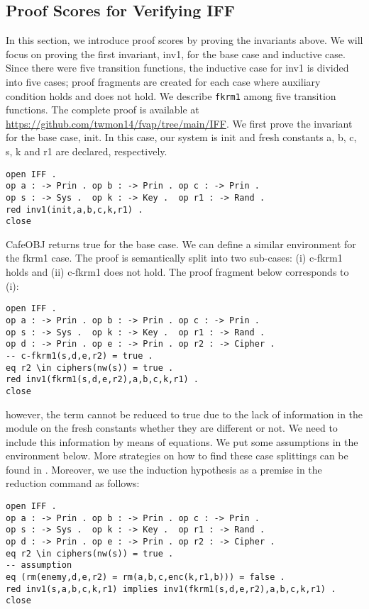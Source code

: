 \documentclass[a4paper,fleqn]{cas-dc}
\begin{document}
\subsection{Proof Scores for Verifying IFF} \label{pscores}
In this section, we introduce proof scores by proving the invariants above. We will focus on proving the first invariant, inv1, for the base case and inductive case. Since there were five transition functions, the inductive case for inv1 is divided into five cases; proof fragments are created for each case where auxiliary condition holds and does not hold. We describe \verb!fkrm1! among five transition functions. The complete proof is available at \url{https://github.com/twmon14/fvap/tree/main/IFF}. We first prove the invariant for the base case, init. In this case, our system is init and fresh constants a, b, c, s, k and r1 are declared, respectively.
\begin{small}
\begin{verbatim}
open IFF .
op a : -> Prin . op b : -> Prin . op c : -> Prin .
op s : -> Sys .  op k : -> Key .  op r1 : -> Rand .
red inv1(init,a,b,c,k,r1) .
close
\end{verbatim}
\end{small}
CafeOBJ returns true for the base case. We can define a similar environment for the fkrm1 case. The proof is semantically split into two sub-cases: (i) c-fkrm1 holds and (ii) c-fkrm1 does not hold. The proof fragment below corresponds to (i):
\begin{small}
\begin{verbatim}
open IFF .
op a : -> Prin . op b : -> Prin . op c : -> Prin .
op s : -> Sys .  op k : -> Key .  op r1 : -> Rand .
op d : -> Prin . op e : -> Prin . op r2 : -> Cipher .
-- c-fkrm1(s,d,e,r2) = true .
eq r2 \in ciphers(nw(s)) = true .
red inv1(fkrm1(s,d,e,r2),a,b,c,k,r1) .
close
\end{verbatim}
\end{small}
however, the term cannot be reduced to true due to the lack of information in the module on the fresh constants whether they are different or not. We need to include this information by means of equations. We put some assumptions in the environment below. More strategies on how to find these case splittings can be found in \cite{OgataF03fmoods, Ogata2006, nakano2003}. Moreover, we use the induction hypothesis as a premise in the reduction command as follows:
\begin{small}
\begin{verbatim}
open IFF .
op a : -> Prin . op b : -> Prin . op c : -> Prin .
op s : -> Sys .  op k : -> Key .  op r1 : -> Rand .
op d : -> Prin . op e : -> Prin . op r2 : -> Cipher .
eq r2 \in ciphers(nw(s)) = true .
-- assumption
eq (rm(enemy,d,e,r2) = rm(a,b,c,enc(k,r1,b))) = false .
red inv1(s,a,b,c,k,r1) implies inv1(fkrm1(s,d,e,r2),a,b,c,k,r1) .
close
\end{verbatim}
\end{small}
\end{document}
